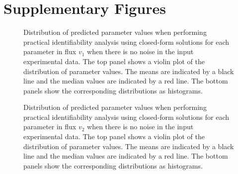 \documentclass[10pt]{article}
\begin{document}
\section{Supplementary Figures}	
\begin{figure}[!tbhp]
	\caption{Distribution of predicted parameter values when performing practical identifiability analysis using closed-form solutions for each parameter in flux $v_1$ when there is no noise in the input experimental data. The top panel shows a violin plot of the distribution of parameter values. The means are indicated by a black line and the median values are indicated by a red line. The bottom panels show the corresponding distributions as histograms.}\label{fig:v1_kcat_ck_values}
\end{figure}

\begin{figure}[!tbhp]
	\caption{Distribution of predicted parameter values when performing practical identifiability analysis using closed-form solutions for each parameter in flux $v_2$ when there is no noise in the input experimental data. The top panel shows a violin plot of the distribution of parameter values. The means are indicated by a black line and the median values are indicated by a red line. The bottom panels show the corresponding distributions as histograms.}\label{fig:v2_ck_values}
\end{figure}
\end{document}
